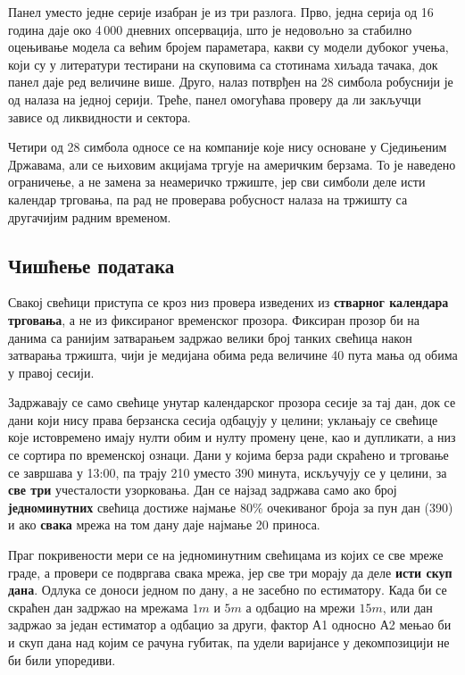 Панел уместо једне серије изабран је из три разлога. Прво, једна серија од 16
година даје око 4\,000 дневних опсервација, што је недовољно за стабилно
оцењивање модела са већим бројем параметара, какви су модели дубоког учења, који су у
литератури тестирани на скуповима са стотинама хиљада тачака, док панел даје ред
величине више. Друго, налаз потврђен на
28 симбола робуснији је од налаза на једној серији. Треће, панел омогућава
проверу да ли закључци зависе од ликвидности и сектора.

Четири од 28 симбола односе се на компаније које нису основане у Сједињеним
Државама, али се њиховим акцијама тргује на америчким берзама. То је наведено
ограничење, а не замена за неамеричко тржиште, јер сви симболи деле исти календар
трговања, па рад не проверава робусност налаза на тржишту са другачијим радним
временом.

\subsection{Чишћење података}
\label{subsec:ciscenje}

Свакој свећици приступа се кроз низ провера изведених из \textbf{стварног календара
трговања}, а не из фиксираног временског прозора. Фиксиран прозор би на данима са
ранијим затварањем задржао велики број танких свећица након затварања тржишта, чији
је медијана обима реда величине 40 пута мања од обима у правој сесији.

Задржавају се само свећице унутар календарског прозора сесије за тај дан, док се дани
који нису права берзанска сесија одбацују у целини; уклањају се свећице које
истовремено имају нулти обим и нулту промену цене, као и дупликати, а низ се сортира
по временској ознаци. Дани у којима берза ради скраћено и трговање се завршава у 13:00,
па трају 210 уместо 390 минута, искључују се у целини, за \textbf{све три}
учесталости узорковања. Дан се најзад задржава само ако број
\textbf{једноминутних} свећица достиже најмање 80\% очекиваног броја за пун дан (390) и
ако \textbf{свака} мрежа на том дану даје најмање 20 приноса.

Праг покривености мери се на једноминутним свећицама из којих се све мреже граде, а
провери се подвргава свака мрежа, јер све три морају да деле \textbf{исти скуп дана}.
Одлука се доноси једном по дану, а не засебно по естиматору. Када би се скраћен дан
задржао на мрежама $1m$ и $5m$ а одбацио на мрежи $15m$, или дан задржао за један
естиматор а одбацио за други, фактор А1 односно А2 мењао би и скуп дана над којим се
рачуна губитак, па удели варијансе у декомпозицији не би били упоредиви.

